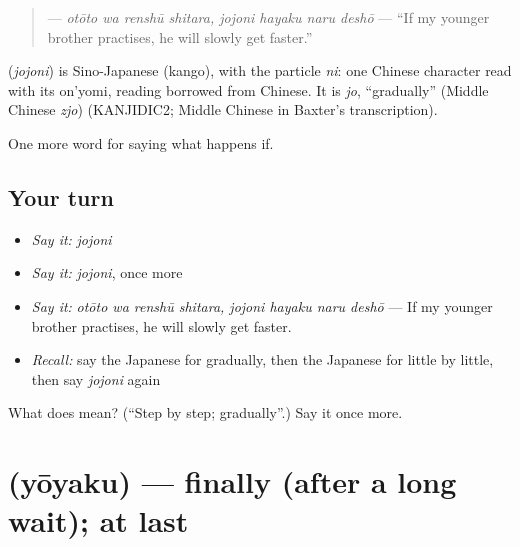 \begin{quote}
\textbf{   } — \emph{otōto wa renshū shitara, jojoni hayaku naru deshō} — \textquotedblleft{}If my younger brother practises, he will slowly get faster.\textquotedblright{}
\end{quote}

\begin{cousinweb}
\textbf{} (\emph{jojoni}) is Sino-Japanese (kango), with the particle \emph{ni}: one Chinese character read with its on'yomi, reading borrowed from Chinese. It is \emph{jo}, \textquotedblleft{}gradually\textquotedblright{} (Middle Chinese \emph{zjo}) (KANJIDIC2; Middle Chinese in Baxter's transcription).
\end{cousinweb}

\begin{grammarlens}[title={What you've built}]
One more word for saying what happens if.
\end{grammarlens}

\subsection*{Your turn}
\begin{itemize}
\raggedright
  \item \emph{Say it:} \emph{jojoni}
  \item \emph{Say it:} \emph{jojoni}, once more
  \item \emph{Say it:} \emph{otōto wa renshū shitara, jojoni hayaku naru deshō} — If my younger brother practises, he will slowly get faster.
  \item \emph{Recall:} say the Japanese for gradually, then the Japanese for little by little, then say \emph{jojoni} again
\end{itemize}

\begin{tcolorbox}[breakable,colback=teal!4,colframe=teal!35!black,title={Before you move on}]
What does  mean? (\textquotedblleft{}Step by step; gradually\textquotedblright{}.) Say it once more.
\end{tcolorbox}
\section[\texorpdfstring{\ja{ようやく} (yōyaku)}{ようやく (yōyaku)}]{ (yōyaku) — finally (after a long wait); at last}

